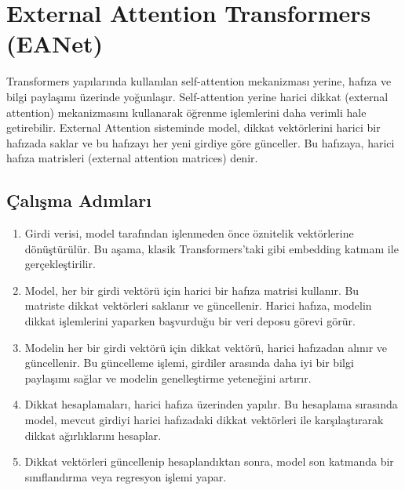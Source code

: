 \section{External Attention Transformers (EANet)}

Transformers yapılarında kullanılan self-attention mekanizması yerine, hafıza ve bilgi paylaşımı üzerinde yoğunlaşır. Self-attention yerine harici dikkat (external attention) mekanizmasını kullanarak öğrenme işlemlerini daha verimli hale getirebilir. External Attention sisteminde model, dikkat vektörlerini harici bir hafızada saklar ve bu hafızayı her yeni girdiye göre günceller. Bu hafızaya, harici hafıza matrisleri (external attention matrices) denir. 

\subsection{Çalışma Adımları}

\begin{enumerate}
    \item Girdi verisi, model tarafından işlenmeden önce öznitelik vektörlerine dönüştürülür. Bu aşama, klasik Transformers'taki gibi embedding katmanı ile gerçekleştirilir.
    \item Model, her bir girdi vektörü için harici bir hafıza matrisi kullanır. Bu matriste dikkat vektörleri saklanır ve güncellenir. Harici hafıza, modelin dikkat işlemlerini yaparken başvurduğu bir veri deposu görevi görür.
    \item Modelin her bir girdi vektörü için dikkat vektörü, harici hafızadan alınır ve güncellenir. Bu güncelleme işlemi, girdiler arasında daha iyi bir bilgi paylaşımı sağlar ve modelin genelleştirme yeteneğini artırır.
    \item Dikkat hesaplamaları, harici hafıza üzerinden yapılır. Bu hesaplama sırasında model, mevcut girdiyi harici hafızadaki dikkat vektörleri ile karşılaştırarak dikkat ağırlıklarını hesaplar.
    \item Dikkat vektörleri güncellenip hesaplandıktan sonra, model son katmanda bir sınıflandırma veya regresyon işlemi yapar.
\end{enumerate}

\newpage